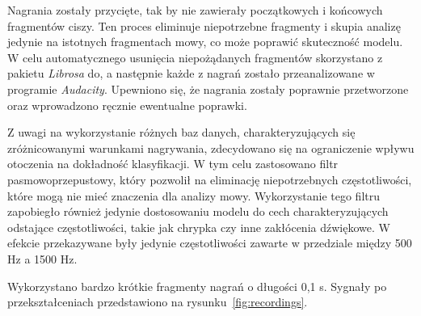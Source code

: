 Nagrania zostały przycięte, tak by nie zawierały początkowych i końcowych fragmentów ciszy.
Ten proces eliminuje niepotrzebne fragmenty i skupia analizę jedynie na istotnych fragmentach mowy, co może poprawić skuteczność modelu.
W celu automatycznego usunięcia niepożądanych fragmentów skorzystano z pakietu \emph{Librosa} do, a następnie każde z nagrań zostało przeanalizowane w programie \emph{Audacity}.
Upewniono się, że nagrania zostały poprawnie przetworzone oraz wprowadzono ręcznie ewentualne poprawki.

Z uwagi na wykorzystanie różnych baz danych, charakteryzujących się zróżnicowanymi warunkami nagrywania, zdecydowano się na ograniczenie wpływu otoczenia na dokładność klasyfikacji.
W tym celu zastosowano filtr pasmowoprzepustowy, który pozwolił na eliminację niepotrzebnych częstotliwości, które mogą nie mieć znaczenia dla analizy mowy.
Wykorzystanie tego filtru zapobiegło również jedynie dostosowaniu modelu do cech charakteryzujących odstające częstotliwości, takie jak chrypka czy inne zakłócenia dźwiękowe.
W efekcie przekazywane były jedynie częstotliwości zawarte w przedziale między 500 Hz a 1500 Hz.

Wykorzystano bardzo krótkie fragmenty nagrań o długości 0,1 s.
Sygnały po przekształceniach przedstawiono na rysunku~\ref{fig:recordings}.

